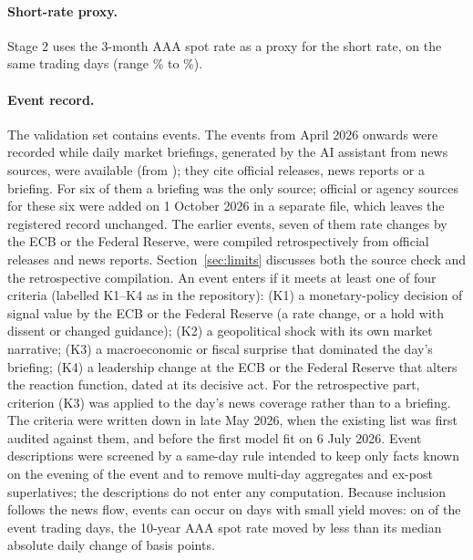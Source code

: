 \documentclass[11pt,a4paper]{article}
\begin{document}
\paragraph{Short-rate proxy.} Stage 2 uses the 3-month AAA spot rate as a proxy for the short rate, on the same \NDays{} trading days (range \RMin\% to \RMax\%).

\paragraph{Event record.} The validation set contains \NEvents{} events. The \NEventsLate{} events from April 2026 onwards were recorded while daily market briefings, generated by the AI assistant from news sources, were available (from \TagStart{}); they cite official releases, news reports or a briefing. For six of them a briefing was the only source; official or agency sources for these six were added on 1 October 2026 in a separate file, which leaves the registered record unchanged. The \NEventsEarly{} earlier events, seven of them rate changes by the ECB or the Federal Reserve, were compiled retrospectively from official releases and news reports. Section~\ref{sec:limits} discusses both the source check and the retrospective compilation. An event enters if it meets at least one of four criteria (labelled K1--K4 as in the repository): (K1) a monetary-policy decision of signal value by the ECB or the Federal Reserve (a rate change, or a hold with dissent or changed guidance); (K2) a geopolitical shock with its own market narrative; (K3) a macroeconomic or fiscal surprise that dominated the day's briefing; (K4) a leadership change at the ECB or the Federal Reserve that alters the reaction function, dated at its decisive act. For the retrospective part, criterion (K3) was applied to the day's news coverage rather than to a briefing. The criteria were written down in late May 2026, when the existing list was first audited against them, and before the first model fit on 6 July 2026. Event descriptions were screened by a same-day rule intended to keep only facts known on the evening of the event and to remove multi-day aggregates and ex-post superlatives; the descriptions do not enter any computation. Because inclusion follows the news flow, events can occur on days with small yield moves: on \NEventsSmallMove{} of the \NEventsTD{} event trading days, the 10-year AAA spot rate moved by less than its median absolute daily change of \MedAbsTen{} basis points.
\end{document}
